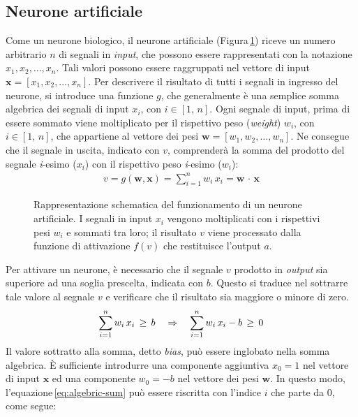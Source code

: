 \subsection{Neurone artificiale}
% 
Come un neurone biologico, il neurone artificiale (Figura\,\ref{fig:artificial-neuron}) riceve un numero arbitrario $n$ di segnali in \textsl{input}, che possono essere rappresentati con la notazione $x_1, x_2, \dots, x_n$. Tali valori possono essere raggruppati nel vettore di input $\mathbf{x} = \left[x_1, x_2, \dots, x_n\right]$. Per descrivere il risultato di tutti i segnali in ingresso del neurone, si introduce una funzione $g$, che generalmente è una semplice somma algebrica dei segnali di input $x_i$, con $i\in[1,\,n]$. Ogni segnale di input, prima di essere sommato viene moltiplicato per il rispettivo peso (\textit{weight}) $w_i$, con $i\in[1,\,n]$, che appartiene al vettore dei pesi $\mathbf{w} = \left[w_1, w_2, \dots, w_n \right]$. Ne consegue che il segnale in uscita, indicato con $v$, comprenderà la somma del prodotto del segnale \textit{i}-esimo ($x_i$) con il rispettivo peso \textit{i}-esimo ($w_i$):
% 
\begin{gather}
    v = g\left(\mathbf{w}, \mathbf{x}\right) = \sum_{i = 1}^n w_i\,x_i = \mathbf{w}\,\cdot\,\mathbf{x}
    \label{eq:algebric-sum}
\end{gather}
% 
\begin{figure}[!b]
    \centering
    
    \caption[Rappresentazione schematica del funzionamento di un neurone artificiale.]{Rappresentazione schematica del funzionamento di un neurone artificiale. I segnali in input $x_i$ vengono moltiplicati con i rispettivi pesi $w_i$ e sommati tra loro; il risultato $v$ viene processato dalla funzione di attivazione $f(v)$ che restituisce l'output $a$.}\label{fig:artificial-neuron}
\end{figure}
% 
\noindent Per attivare un neurone, è necessario che il segnale $v$ prodotto in \textsl{output} sia superiore ad una soglia prescelta, indicata con $b$. Questo si traduce nel sottrarre tale valore al segnale $v$ e verificare che il risultato sia maggiore o minore di zero.
% 
\begin{gather*}
    \sum_{i = 1}^n w_i\,x_i \,\geq\, b
    \hspace{10px} \Rightarrow \hspace{10px}
    \sum_{i = 1}^n w_i\,x_i - b \,\geq\, 0
\end{gather*}
% 
\noindent Il valore sottratto alla somma, detto \textit{bias}, può essere inglobato nella somma algebrica. È sufficiente introdurre una componente aggiuntiva $x_0 = 1$ nel vettore di input $\mathbf{x}$ ed una componente $w_0 = -b$ nel vettore dei pesi $\mathbf{w}$. In questo modo, l'equazione\,\ref{eq:algebric-sum} può essere riscritta con l'indice $i$ che parte da 0, come segue:
